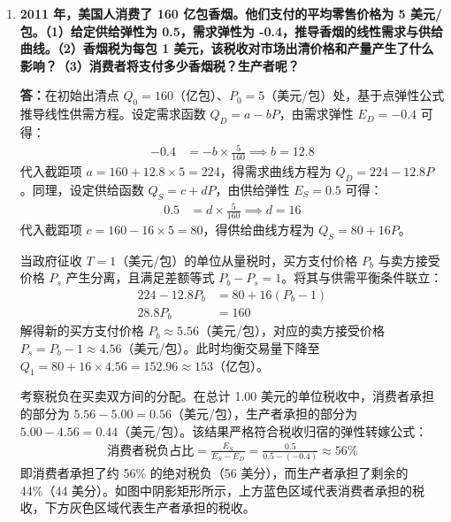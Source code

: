 \begin{enumerate}[label=\textbf{\arabic*.}, leftmargin=*]
\begin{center}
		\end{center}
		
		\newpage
		
		
		\item \textbf{2011 年，美国人消费了 160 亿包香烟。他们支付的平均零售价格为 5 美元/包。（1）给定供给弹性为 0.5，需求弹性为 -0.4，推导香烟的线性需求与供给曲线。（2）香烟税为每包 1 美元，该税收对市场出清价格和产量产生了什么影响？（3）消费者将支付多少香烟税？生产者呢？}
		
		\textbf{答：}在初始出清点 $Q_0 = 160$（亿包）、$P_0 = 5$（美元/包）处，基于点弹性公式推导线性供需方程。设定需求函数 $Q_D = a - bP$，由需求弹性 $E_D = -0.4$ 可得：
		\[
		\begin{aligned}
			-0.4 &= -b \times \frac{5}{160} \implies b = 12.8
		\end{aligned}
		\]
		代入截距项 $a = 160 + 12.8 \times 5 = 224$，得需求曲线方程为 $Q_D = 224 - 12.8P$。同理，设定供给函数 $Q_S = c + dP$，由供给弹性 $E_S = 0.5$ 可得：
		\[
		\begin{aligned}
			0.5 &= d \times \frac{5}{160} \implies d = 16
		\end{aligned}
		\]
		代入截距项 $c = 160 - 16 \times 5 = 80$，得供给曲线方程为 $Q_S = 80 + 16P$。
		
		当政府征收 $T=1$（美元/包）的单位从量税时，买方支付价格 $P_b$ 与卖方接受价格 $P_s$ 产生分离，且满足差额等式 $P_b - P_s = 1$。将其与供需平衡条件联立：
		\[
		\begin{aligned}
			224 - 12.8P_b &= 80 + 16(P_b - 1) \\
			28.8P_b &= 160
		\end{aligned}
		\]
		解得新的买方支付价格 $P_b \approx 5.56$（美元/包），对应的卖方接受价格 $P_s = P_b - 1 \approx 4.56$（美元/包）。此时均衡交易量下降至 $Q_1 = 80 + 16 \times 4.56 = 152.96 \approx 153$（亿包）。
		
		考察税负在买卖双方间的分配。在总计 1.00 美元的单位税收中，消费者承担的部分为 $5.56 - 5.00 = 0.56$（美元/包），生产者承担的部分为 $5.00 - 4.56 = 0.44$（美元/包）。该结果严格符合税收归宿的弹性转嫁公式：
		\[
		\begin{aligned}
			\text{消费者税负占比} = \frac{E_S}{E_S - E_D} = \frac{0.5}{0.5 - (-0.4)} \approx 56\%
		\end{aligned}
		\]
		即消费者承担了约 56\% 的绝对税负（56 美分），而生产者承担了剩余的 44\%（44 美分）。如图中阴影矩形所示，上方蓝色区域代表消费者承担的税收，下方灰色区域代表生产者承担的税收。
		

\end{enumerate}
